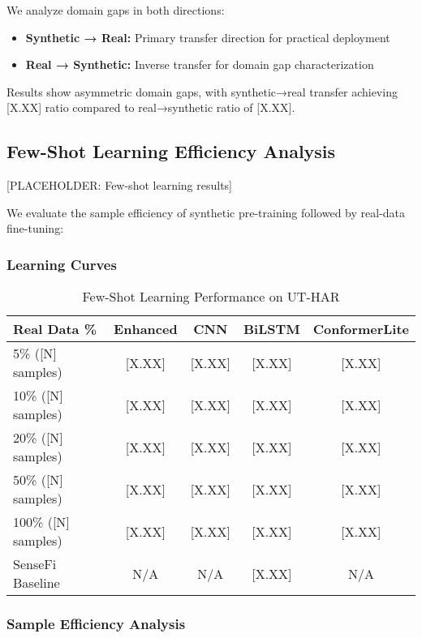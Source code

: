 \documentclass[journal]{IEEEtran}
\begin{document}
We analyze domain gaps in both directions:
\begin{itemize}
\item \textbf{Synthetic → Real:} Primary transfer direction for practical deployment
\item \textbf{Real → Synthetic:} Inverse transfer for domain gap characterization
\end{itemize}

Results show asymmetric domain gaps, with synthetic→real transfer achieving [X.XX] ratio compared to real→synthetic ratio of [X.XX].

\subsection{Few-Shot Learning Efficiency Analysis}

[PLACEHOLDER: Few-shot learning results]

We evaluate the sample efficiency of synthetic pre-training followed by real-data fine-tuning:

\subsubsection{Learning Curves}

\begin{table}[ht]
\centering
\caption{Few-Shot Learning Performance on UT-HAR}
\begin{tabular}{@{}lcccc@{}}
\toprule
Real Data \% & Enhanced & CNN & BiLSTM & ConformerLite \\
\midrule
5\% ([N] samples) & [X.XX] & [X.XX] & [X.XX] & [X.XX] \\
10\% ([N] samples) & [X.XX] & [X.XX] & [X.XX] & [X.XX] \\
20\% ([N] samples) & [X.XX] & [X.XX] & [X.XX] & [X.XX] \\
50\% ([N] samples) & [X.XX] & [X.XX] & [X.XX] & [X.XX] \\
100\% ([N] samples) & [X.XX] & [X.XX] & [X.XX] & [X.XX] \\
\midrule
SenseFi Baseline & N/A & N/A & [X.XX] & N/A \\
\bottomrule
\end{tabular}
\end{table}

\subsubsection{Sample Efficiency Analysis}
\end{document}
